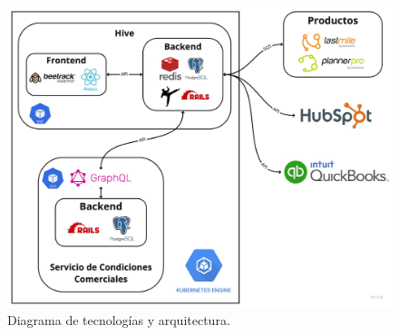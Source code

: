   \begin{figure}
    \centering
    \includegraphics[width=\linewidth]{figures/arquitectura.jpg}
    \caption{Diagrama de tecnologías y arquitectura.}
    \label{fig:arquitectura}
  \end{figure}